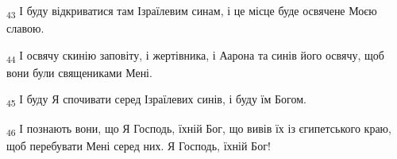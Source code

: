 \begin{tcolorbox}
\textsubscript{43} І буду відкриватися там Ізраїлевим синам, і це місце буде освячене Моєю славою.
\end{tcolorbox}
\begin{tcolorbox}
\textsubscript{44} І освячу скинію заповіту, і жертівника, і Аарона та синів його освячу, щоб вони були священиками Мені.
\end{tcolorbox}
\begin{tcolorbox}
\textsubscript{45} І буду Я спочивати серед Ізраїлевих синів, і буду їм Богом.
\end{tcolorbox}
\begin{tcolorbox}
\textsubscript{46} І познають вони, що Я Господь, їхній Бог, що вивів їх із єгипетського краю, щоб перебувати Мені серед них. Я Господь, їхній Бог!
\end{tcolorbox}
